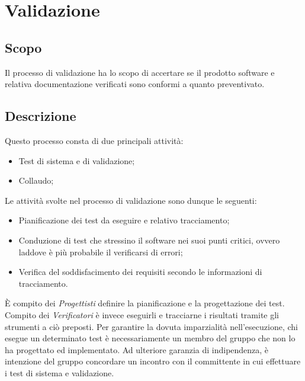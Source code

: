 \documentclass[../NormediProgetto.tex]{subfiles}
\begin{document}

\section{Validazione}

\subsection{Scopo}
Il processo di validazione ha lo scopo di accertare se il prodotto software e relativa documentazione verificati sono conformi a quanto preventivato.

\subsection{Descrizione}

Questo processo consta di due principali attività:

\begin{itemize}
    \item Test di sistema e di validazione;
    \item Collaudo;
\end{itemize}

Le attività svolte nel processo di validazione sono dunque le seguenti:

\begin{itemize}
    \item Pianificazione dei test da eseguire e relativo tracciamento;
    
    \item Conduzione di test che stressino il software nei suoi punti critici, ovvero laddove è più probabile il verificarsi di errori;
    
    \item Verifica del soddisfacimento dei requisiti secondo le informazioni di tracciamento.
\end{itemize}

È compito dei \textit{Progettisti} definire la pianificazione e la progettazione dei test. Compito dei \textit{Verificatori} è invece eseguirli e tracciarne i risultati tramite gli strumenti a ciò preposti. Per garantire la dovuta imparzialità nell'esecuzione, chi esegue un determinato test è necessariamente un membro del gruppo che non lo ha progettato ed implementato. Ad ulteriore garanzia di indipendenza, è intenzione del gruppo concordare un incontro con il committente in cui effettuare i test di sistema e validazione.
\end{document}
